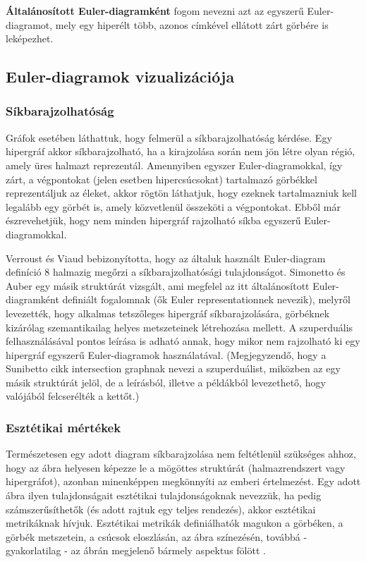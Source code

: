 \begin{definition}
\textbf{Általánosított Euler-diagramként} fogom nevezni azt az egyszerű Euler-diagramot, mely egy hiperélt több, azonos címkével ellátott zárt görbére is leképezhet.
\end{definition}


\subsection{Euler-diagramok vizualizációja}

\subsubsection{Síkbarajzolhatóság}
Gráfok esetében láthattuk, hogy felmerül a síkbarajzolhatóság kérdése. Egy hipergráf akkor síkbarajzolható, ha a kirajzolása során nem jön létre olyan régió, amely üres halmazt reprezentál. Amennyiben egyszer Euler-diagramokkal, így zárt, a végpontokat (jelen esetben hipercsúcsokat) tartalmazó görbékkel reprezentáljuk az éleket, akkor rögtön láthatjuk, hogy ezeknek tartalmazniuk kell legalább egy görbét is, amely közvetlenül összeköti a végpontokat. Ebből már észrevehetjük, hogy nem minden hipergráf rajzolható síkba egyszerű Euler-diagramokkal.


Verroust és Viaud bebizonyította\cite{drawability_8_sets}, hogy az általuk használt Euler-diagram definíció 8 halmazig megőrzi a síkbarajzolhatósági tulajdonságot. Simonetto és Auber egy másik struktúrát vizsgált\cite{simonetto_undrawable}, ami megfelel az itt általánosított Euler-diagramként definiált fogalomnak (ők Euler representationnek nevezik), melyről levezették, hogy alkalmas tetszőleges hipergráf síkbarajzolására, görbéknek kizárólag szemantikailag helyes metszeteinek létrehozása mellett. A szuperduális felhasználásával pontos leírása is adható annak, hogy mikor nem rajzolható ki egy hipergráf egyszerű Euler-diagramok használatával\cite{simonetto_undrawable, drawability_8_sets}. (Megjegyzendő, hogy a Sunibetto cikk intersection graphnak nevezi a szuperduálist, miközben az egy másik struktúrát jelöl, de a leírásból, illetve a példákból levezethető, hogy valójából felcserélték a kettőt.)

\subsubsection{Esztétikai mértékek}

Természetesen egy adott diagram síkbarajzolása nem feltétlenül szükséges ahhoz, hogy az ábra helyesen képezze le a mögöttes struktúrát (halmazrendszert vagy hipergráfot), azonban minenképpen megkönnyíti az emberi értelmezést. Egy adott ábra ilyen tulajdonságait esztétikai tulajdonságoknak nevezzük, ha pedig számszerűsíthetők (és adott rajtuk egy teljes rendezés), akkor esztétikai metrikáknak hívjuk. Esztétikai metrikák definiálhatók magukon a görbéken, a görbék metszetein, a csúcsok eloszlásán, az ábra színezésén, továbbá - gyakorlatilag - az ábrán megjelenő bármely aspektus fölött \cite{euler_force, which_well_formed, layout_metrics}.


